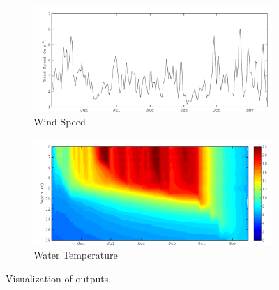 \begin{figure}
\begin{subfigure}{\lafigsize}
		\end{subfigure}
		\begin{subfigure}{\lafigsize}
			\caption{Wind Speed}
			\includegraphics[width=\textwidth]{figures/Sparkling_wndSpd.pdf}
		\end{subfigure}
		\begin{subfigure}{\lafigsize}
			\caption{Water Temperature}
			\includegraphics[width=\textwidth]{figures/Sparkling_wTemp.pdf}
		\end{subfigure}
		\caption{Visualization of \la outputs.}
	\end{figure}

